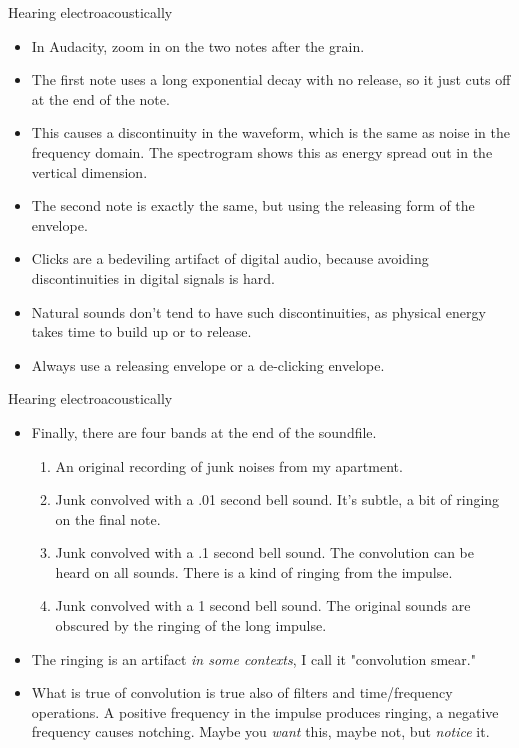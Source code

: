 \documentclass{beamer}
\begin{document}
\begin{frame}{Hearing electroacoustically}
\begin{itemize}
\item In Audacity, zoom in on the two notes after the grain.
\item The first note uses a long exponential decay with no release, so it just cuts off at the end of the note.
\item This causes a discontinuity in the waveform, which is the same as noise in the frequency domain. The spectrogram shows this as  energy spread out in the vertical dimension.
\item The second note is exactly the same, but using the releasing form of the envelope.
\item Clicks are a bedeviling artifact of digital audio, because avoiding discontinuities in digital signals is hard.
\item Natural sounds don't tend to have such discontinuities, as physical energy takes time to build up or to release.
\item Always use a releasing envelope or a de-clicking envelope.
\end{itemize}
\end{frame}

\begin{frame}{Hearing electroacoustically}
\begin{itemize}
\item Finally, there are four bands at the end of the soundfile.
\begin{enumerate}
\item An original recording of junk noises from my apartment.
\item Junk convolved with a .01 second bell sound. It's subtle, a bit of ringing on the final note.
\item Junk convolved with a .1 second bell sound. The convolution can be heard on all sounds. There is a kind of ringing from the impulse.
\item Junk convolved with a 1 second bell sound. The original sounds are obscured by the ringing of the long impulse.
\end{enumerate}
\item The ringing is an artifact \emph{in some contexts}, I call it "convolution smear."
\item What is true of convolution is true also of filters and time/frequency operations. A positive frequency in the impulse produces ringing, a negative frequency causes notching. Maybe you \emph{want} this, maybe not, but \emph{notice} it.
\end{itemize}
\end{frame}
\end{document}
